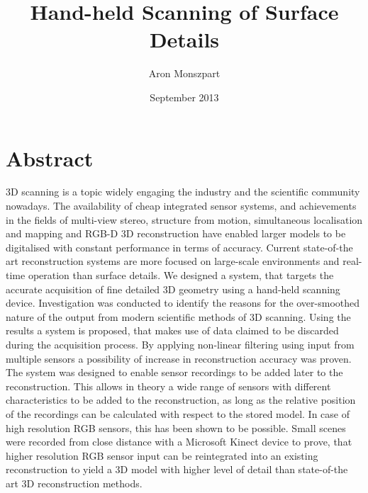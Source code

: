 \documentclass{ucl_thesis}
\author{Aron Monszpart}
\title{Hand-held Scanning of Surface Details}
\date{September 2013}
\begin{document}

\maketitle
{}
\setcounter{page}{1}
\pagestyle{plain}



\newpage
\section*{Abstract}

3D scanning is a topic widely engaging the industry and the scientific community nowadays. The availability of cheap integrated sensor systems, and achievements in the fields of multi-view stereo, structure from motion, simultaneous localisation and mapping and RGB-D 3D reconstruction have enabled larger models to be digitalised with constant performance in terms of accuracy. Current state-of-the art reconstruction systems are more focused on large-scale environments and real-time operation than surface details. We designed a system, that targets the accurate acquisition of fine detailed 3D geometry using a hand-held scanning device.  Investigation was conducted to identify the reasons for the over-smoothed nature of the output from modern scientific methods of 3D scanning. Using the results a system is proposed, that makes use of data claimed to be discarded during the acquisition process. By applying non-linear filtering using input from multiple sensors a possibility of increase in reconstruction accuracy was proven. The system was designed to enable sensor recordings to be added later to the reconstruction. This allows in theory a wide range of sensors with different characteristics to be added to the reconstruction, as long as the relative position of the recordings can be calculated with respect to the stored model. In case of high resolution RGB sensors, this has been shown to be possible. Small scenes were recorded from close distance with a Microsoft Kinect device to prove, that higher resolution RGB sensor input can be reintegrated into an existing reconstruction to yield a 3D model with higher level of detail than state-of-the art 3D reconstruction methods.
\end{document}
